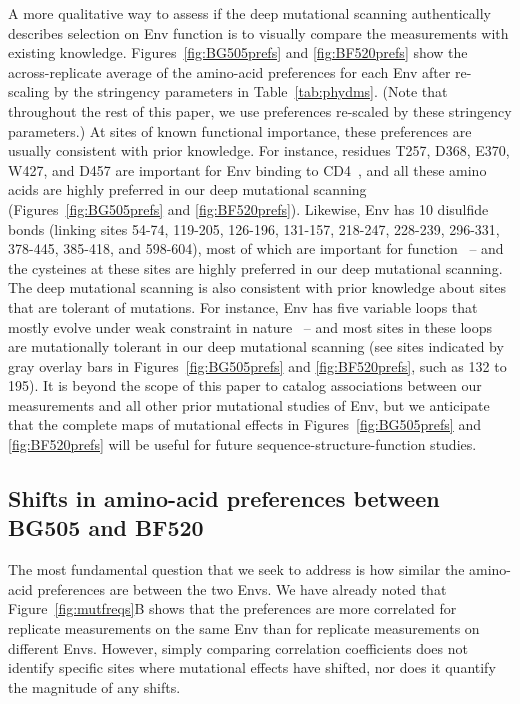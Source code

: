 \documentclass[9pt]{elife}
\begin{document}
A more qualitative way to assess if the deep mutational scanning authentically describes selection on Env function is to visually compare the measurements with existing knowledge.
Figures~\ref{fig:BG505prefs} and \ref{fig:BF520prefs} show the across-replicate average of the amino-acid preferences for each Env after re-scaling by the stringency parameters in Table~\ref{tab:phydms}.
(Note that throughout the rest of this paper, we use preferences re-scaled by these stringency parameters.)
At sites of known functional importance, these preferences are usually consistent with prior knowledge.
For instance, residues T257, D368, E370, W427, and D457 are important for Env binding to CD4~\citep{olshevsky1990identification}, and all these amino acids are highly preferred in our deep mutational scanning (Figures~\ref{fig:BG505prefs} and \ref{fig:BF520prefs}).
Likewise, Env has 10 disulfide bonds (linking sites 54-74, 119-205, 126-196, 131-157, 218-247, 228-239, 296-331, 378-445, 385-418, and 598-604), most of which are important for function~\citep{van2008only} -- and the cysteines at these sites are highly preferred in our deep mutational scanning.
The deep mutational scanning is also consistent with prior knowledge about sites that are tolerant of mutations.
For instance, Env has five variable loops that mostly evolve under weak constraint in nature~\citep{starcich1986identification,zolla2010structure} -- and most sites in these loops are mutationally tolerant in our deep mutational scanning (see sites indicated by gray overlay bars in Figures~\ref{fig:BG505prefs} and \ref{fig:BF520prefs}, such as 132 to 195).
It is beyond the scope of this paper to catalog associations between our measurements and all other prior mutational studies of Env, but we anticipate that the complete maps of mutational effects in Figures~\ref{fig:BG505prefs} and \ref{fig:BF520prefs} will be useful for future sequence-structure-function studies.

\subsection{Shifts in amino-acid preferences between BG505 and BF520}
The most fundamental question that we seek to address is how similar the amino-acid preferences are between the two Envs.
We have already noted that Figure~\ref{fig:mutfreqs}B shows that the preferences are more correlated for replicate measurements on the same Env than for replicate measurements on different Envs.
However, simply comparing correlation coefficients does not identify specific sites where mutational effects have shifted, nor does it quantify the magnitude of any shifts.
\end{document}
